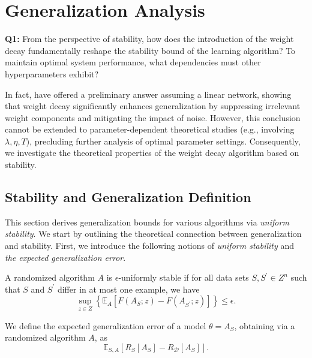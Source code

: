 \section{Generalization Analysis}

\begin{tcolorbox}
\textbf{Q1:} From the perspective of stability, how does the introduction of the weight decay fundamentally reshape the stability bound of the learning algorithm? To maintain optimal system performance, what dependencies must other hyperparameters exhibit? 
\end{tcolorbox}

In fact, \citet{10.5555/2986916.2987033} have offered a preliminary answer assuming a linear network, showing that weight decay significantly enhances generalization by suppressing irrelevant weight components and mitigating the impact of noise. However, this conclusion cannot be extended to parameter-dependent theoretical studies (e.g., involving $\lambda, \eta, T$), precluding further analysis of optimal parameter settings. Consequently, we investigate the theoretical properties of the weight decay algorithm based on stability.


\subsection{Stability and Generalization Definition}
This section derives generalization bounds for various algorithms via \emph{uniform stability}. We start by outlining the theoretical connection between generalization and stability.
First, we introduce the following notions of \emph{uniform stability} and \emph{the expected generalization error}.
\begin{definition}
A randomized algorithm $A$ is $\epsilon$-uniformly stable if for all data sets $S, S^{\prime} \in Z^{n}$ such that $S$ and $S^{\prime}$ differ in at most one example, we have
    \begin{equation}\label{E-stab}
     \mathop{sup}\limits_{z\in Z}\left\{\mathbb{E}_{A}\left[F(A_S;z)-F(A_{S^{\prime}};z)\right] \right\} \leq \epsilon.
    \end{equation}
\end{definition}

We define the expected generalization error of a model $\theta = A_S$, obtaining via a randomized algorithm $A$, as
\begin{equation}\label{D-gen}
\mathbb{E}_{S,A}\left[R_{S}\left[A_S\right]-R_\mathcal{D}\left[A_S\right]\right]. 
\end{equation}

